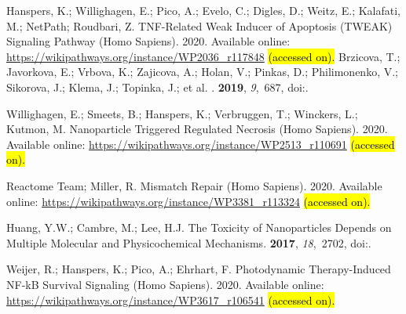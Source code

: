 \documentclass[ijms,article,accept,moreauthors,pdftex]{Definitions/mdpi}
\begin{document}
\begin{thebibliography}{999}
Hanspers, K.; Willighagen, E.; Pico, A.; Evelo, C.; Digles, D.; Weitz, E.;
  Kalafati, M.; NetPath; Roudbari, Z.
\newblock TNF-Related Weak Inducer of Apoptosis (TWEAK) Signaling Pathway (Homo
  Sapiens).  2020.
\newblock Available online: \url{https://wikipathways.org/instance/WP2036_r117848} \hl{(accessed on). } %
Brzicova, T.; Javorkova, E.; Vrbova, K.; Zajicova, A.; Holan, V.; Pinkas, D.;
  Philimonenko, V.; Sikorova, J.; Klema, J.; Topinka, J.; et al.
.
 {\bf 2019}, {\em 9},~687,
\newblock
  doi:{\href{https://doi.org/10.3390/nano9050687}{}}.

Willighagen, E.; Smeets, B.; Hanspers, K.; Verbruggen, T.; Winckers, L.;
  Kutmon, M.
\newblock Nanoparticle Triggered Regulated Necrosis (Homo Sapiens). 2020.
\newblock Available online: \url{https://wikipathways.org/instance/WP2513_r110691} \hl{(accessed on). } %

{Reactome Team}; Miller, R.
\newblock Mismatch Repair (Homo Sapiens). 2020.
\newblock Available online: \url{https://wikipathways.org/instance/WP3381_r113324} \hl{(accessed on). } %

Huang, Y.W.; Cambre, M.; Lee, H.J.
\newblock The Toxicity of Nanoparticles Depends on Multiple Molecular and
  Physicochemical Mechanisms.
 {\bf 2017}, {\em
  18},~2702,
\newblock
  doi:{\href{https://doi.org/10.3390/ijms18122702}{}}.

Weijer, R.; Hanspers, K.; Pico, A.; Ehrhart, F.
\newblock Photodynamic Therapy-Induced NF-kB Survival Signaling (Homo Sapiens). 2020.
\newblock Available online: \url{https://wikipathways.org/instance/WP3617_r106541} \hl{(accessed on). } %


\end{thebibliography}
\end{document}
